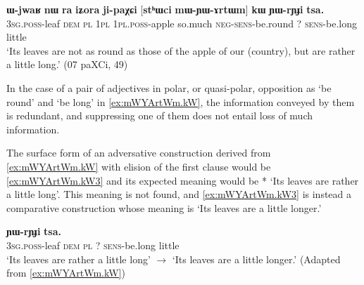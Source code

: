 \documentclass[oldfontcommands,oneside,a4paper,11pt]{article}
\newcommand{\ipa}[1]{{\phon\textbf{#1}}}
\begin{document}
           \begin{exe}
  \ex  \label{ex:mWYArtWm.kW}  
  \gll      
\ipa{ɯ-jwaʁ} 	\ipa{nɯ} \ipa{ra} 	\ipa{iʑora} 	\ipa{ji-paχɕi} 	[\ipa{stʰɯci} 	\ipa{mɯ-ɲɯ-ɤrtɯm}] 	\ipa{kɯ} 	\ipa{ɲɯ-rɲɟi} 	\ipa{tsa.} \\
\textsc{3sg.poss}-leaf \textsc{dem} \textsc{pl} \textsc{1pl} \textsc{1pl.poss}-apple so.much \textsc{neg-sens}-be.round ?{ } \textsc{sens}-be.long little \\
\glt `Its leaves  are not as round as those of the apple of our (country), but are rather a little long.'
(07 paXCi, 49)
          \end{exe} 
 
% 
          
          In the case of a pair of adjectives in polar, or quasi-polar, opposition as `be round' and  `be long' in \ref{ex:mWYArtWm.kW}, the information conveyed by them is redundant, and suppressing one of them does not entail loss of much information.   
          
          The surface form of an adversative construction derived from \ref{ex:mWYArtWm.kW}  with elision  of the first clause would be  \ref{ex:mWYArtWm.kW3}  and its expected meaning would be * `Its leaves are  rather a little long'.   This meaning is not found, and \ref{ex:mWYArtWm.kW3}   is instead a comparative construction whose meaning is `Its leaves are a little longer.' 
            
                      \begin{exe}
  \ex  \label{ex:mWYArtWm.kW3}  
  \gll      
[\ipa{ɯ-jwaʁ} 	\ipa{nɯ}   \ipa{ra}] 	\ipa{kɯ} 	\ipa{ɲɯ-rɲɟi} 	\ipa{tsa.} \\
\textsc{3sg.poss}-leaf \textsc{dem} \textsc{pl}   ?{ } \textsc{sens}-be.long little \\
\glt *`Its leaves are rather a little long'  $\rightarrow$  `Its leaves are a little longer.'
(Adapted from \ref{ex:mWYArtWm.kW})
          \end{exe} 
  
\end{document}
